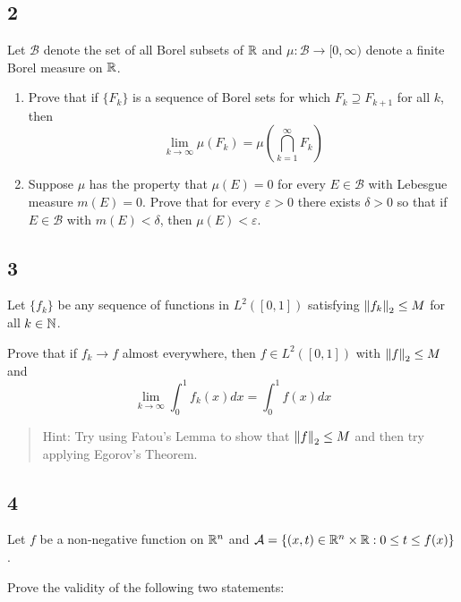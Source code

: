 \hypertarget{section-1}{%
\subsection{2}\label{section-1}}

Let \(\mathcal B\) denote the set of all Borel subsets of \({\mathbb{R}}\) and
\(\mu : \mathcal B \to [0, \infty)\) denote a finite Borel measure on
\({\mathbb{R}}\).

\begin{enumerate}
\def\labelenumi{\alph{enumi}.}
\tightlist
\item
  Prove that if \(\{F_k\}\) is a sequence of Borel sets for which
  \(F_k \supseteq F_{k+1}\) for all \(k\), then \[
    \lim _{k \rightarrow \infty} \mu\left(F_{k}\right)=\mu\left(\bigcap_{k=1}^{\infty} F_{k}\right)
    \]
\item
  Suppose \(\mu\) has the property that \(\mu(E) = 0\) for every
  \(E \in \mathcal B\) with Lebesgue measure \(m(E) = 0\). Prove that
  for every \(\varepsilon > 0\) there exists \(\delta > 0\) so that if
  \(E \in \mathcal B\) with \(m(E) < \delta\), then \(\mu(E) < \varepsilon\).
\end{enumerate}

\hypertarget{section-2}{%
\subsection{3}\label{section-2}}

Let \(\{f_k\}\) be any sequence of functions in \(L^2([0, 1])\)
satisfying \({\left\lVert {f_k} \right\rVert}_2 \leq M\) for all \(k \in {\mathbb{N}}\).

Prove that if \(f_k \to f\) almost everywhere, then \(f \in L^2([0, 1])\)
with \({\left\lVert {f} \right\rVert}_2 \leq M\) and \[
\lim _{k \rightarrow \infty} \int_{0}^{1} f_{k}(x) dx = \int_{0}^{1} f(x) d x
\]

\begin{quote}
Hint: Try using Fatou's Lemma to show that \({\left\lVert {f} \right\rVert}_2 \leq M\) and then
try applying Egorov's Theorem.
\end{quote}

\hypertarget{section-3}{%
\subsection{4}\label{section-3}}

Let \(f\) be a non-negative function on \({\mathbb{R}}^n\) and
\(\mathcal A = \{(x, t) \in {\mathbb{R}}^n \times {\mathbb{R}} : 0 \leq t \leq f (x)\}\).

Prove the validity of the following two statements:

